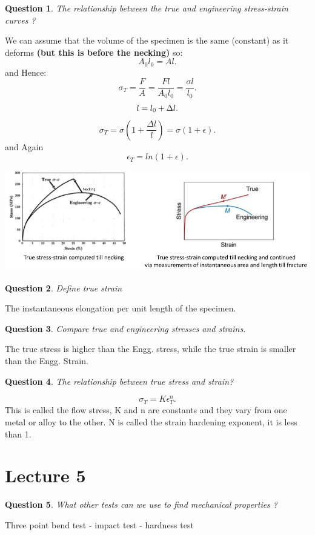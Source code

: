 \documentclass[13]{article}
\newtheorem{exer}{Question}
\begin{document}
\begin{exer}
The relationship between the true and engineering stress-strain curves ?
\end{exer}
We can assume that the volume of the specimen is the same (constant) as it deforms \textbf{(but this is before the necking)}  so:
\[
A_0l_0 = Al
.\] 
and Hence:
\[
\sigma_T = \frac{F}{A} = \frac{Fl}{A_0l_0} = \frac{\sigma l}{l_0}
.\] 
\[
l = l_0+\Delta l \\ 
.\] 
\[
\sigma_T = \sigma (1+\frac{\Delta l}{l}) = \sigma (1+ \epsilon)
.\]
and Again
\[
	\epsilon_T = ln(1+ \epsilon)
.\] 
\begin{center}
\includegraphics[scale=0.5]{figures/8.png}
\end{center}
\begin{exer}
Define true strain
\end{exer}
The instantaneous elongation per unit length of the specimen.
\begin{exer}
Compare true and engineering stresses and strains.
\end{exer}
The true stress is higher than the Engg. stress, while the true strain is smaller than the Engg. Strain.
\begin{exer}
The relationship between true stress and strain?
\end{exer}
\[
\sigma_T = K \epsilon_T^n
.\] 
This is called the flow stress, K and n are constants and they vary from one metal or alloy to the other. N is called the strain hardening exponent, it is less than 1. 
\section{Lecture 5}
\begin{exer}
	What other tests can we use to find mechanical properties ?
\end{exer}
Three point bend test - impact test - hardness test
\end{document}
